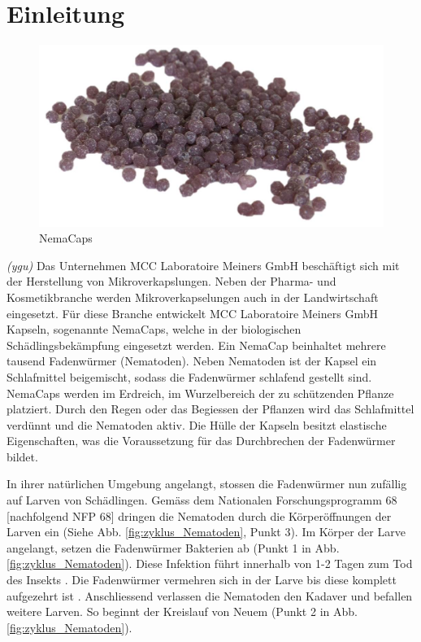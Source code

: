 \newpage
\section{Einleitung}
\begin{figure}
	\includegraphics[draft=false,scale=0.18]{Illustrationen/3-Einleitung/nemacaps_1.jpg}
	\caption{NemaCaps}
	\label{fig:nemacaps}
\end{figure}
\textit{(ygu)} Das Unternehmen MCC Laboratoire Meiners GmbH beschäftigt sich mit der Herstellung von Mikroverkapslungen. Neben der Pharma- und Kosmetikbranche werden Mikroverkapselungen auch in der Landwirtschaft eingesetzt. Für diese Branche entwickelt MCC Laboratoire Meiners GmbH Kapseln, sogenannte NemaCaps, welche in der biologischen Schädlingsbekämpfung eingesetzt werden. Ein NemaCap beinhaltet mehrere tausend Fadenwürmer (Nematoden). Neben Nematoden ist der Kapsel ein Schlafmittel beigemischt, sodass die Fadenwürmer schlafend gestellt sind. 
\newline
NemaCaps werden im Erdreich, im Wurzelbereich der zu schützenden Pflanze platziert. Durch den Regen oder das Begiessen der Pflanzen wird das Schlafmittel verdünnt und die Nematoden aktiv. Die Hülle der Kapseln besitzt elastische Eigenschaften, was die Voraussetzung für das Durchbrechen der Fadenwürmer bildet. 
\newline

In ihrer natürlichen Umgebung angelangt, stossen die Fadenwürmer nun zufällig auf Larven von Schädlingen. Gemäss dem Nationalen Forschungsprogramm 68 [nachfolgend NFP 68]\cite{nfp} dringen die Nematoden durch die Körperöffnungen der Larven ein (Siehe Abb.  \ref{fig:zyklus_Nematoden}, Punkt 3). Im Körper der Larve angelangt, setzen die Fadenwürmer Bakterien ab (Punkt 1 in Abb.  \ref{fig:zyklus_Nematoden}). Diese Infektion führt innerhalb von 1-2 Tagen zum Tod des Insekts \cite{e-nema}. Die Fadenwürmer vermehren sich in der Larve bis diese komplett aufgezehrt ist \cite{nematoden}. Anschliessend verlassen die Nematoden den Kadaver und befallen weitere Larven. So beginnt der Kreislauf von Neuem (Punkt 2 in Abb.  \ref{fig:zyklus_Nematoden}).
\newline

